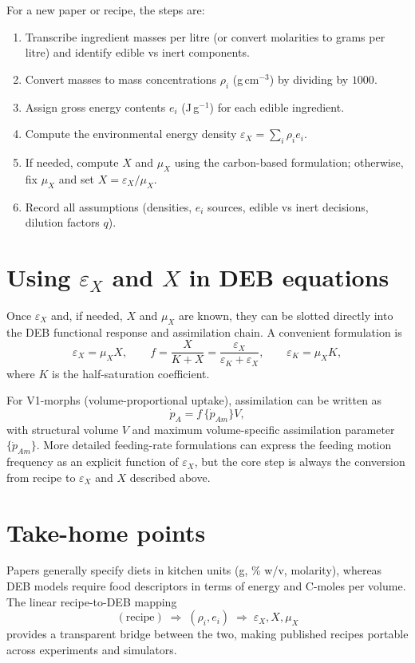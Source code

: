 \documentclass[11pt]{article}
\begin{document}
For a new paper or recipe, the steps are:
\begin{enumerate}
  \item Transcribe ingredient masses per litre (or convert molarities to grams per litre) and identify edible vs inert components.
  \item Convert masses to mass concentrations $\rho_i$ (g\,cm$^{-3}$) by dividing by $1000$.
  \item Assign gross energy contents $e_i$ (J\,g$^{-1}$) for each edible ingredient.
  \item Compute the environmental energy density $\varepsilon_X = \sum_i \rho_i e_i$.
  \item If needed, compute $X$ and $\mu_X$ using the carbon-based formulation; otherwise, fix $\mu_X$ and set $X = \varepsilon_X/\mu_X$.
  \item Record all assumptions (densities, $e_i$ sources, edible vs inert decisions, dilution factors $q$).
\end{enumerate}

\section{Using $\varepsilon_X$ and $X$ in DEB equations}

Once $\varepsilon_X$ and, if needed, $X$ and $\mu_X$ are known, they can be slotted directly into the DEB functional response and assimilation chain. A convenient formulation is
\begin{equation}
  \varepsilon_X = \mu_X X, \qquad f = \frac{X}{K+X} = \frac{\varepsilon_X}{\varepsilon_K + \varepsilon_X}, \qquad \varepsilon_K = \mu_X K,
\end{equation}
where $K$ is the half-saturation coefficient.

For V1-morphs (volume-proportional uptake), assimilation can be written as
\begin{equation}
  \dot p_A = f\,\{\dot p_{Am}\} V,
\end{equation}
with structural volume $V$ and maximum volume-specific assimilation parameter $\{\dot p_{Am}\}$. More detailed feeding-rate formulations can express the feeding motion frequency as an explicit function of $\varepsilon_X$, but the core step is always the conversion from recipe to $\varepsilon_X$ and $X$ described above.

\section{Take-home points}

Papers generally specify diets in kitchen units (g, \% w/v, molarity), whereas DEB models require food descriptors in terms of energy and C-moles per volume. The linear recipe-to-DEB mapping
\begin{equation}
  (\text{recipe}) \;\Rightarrow\; (\rho_i, e_i) \;\Rightarrow\; \varepsilon_X, X, \mu_X
\end{equation}
provides a transparent bridge between the two, making published recipes portable across experiments and simulators.
\end{document}
